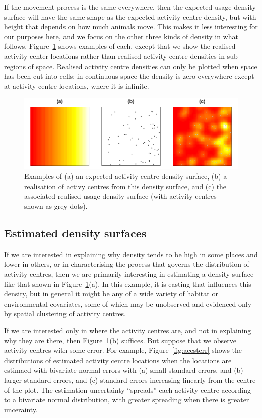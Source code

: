 \documentclass[10pt,a4paper]{article}
\begin{document}
If the movement process is the same everywhere, then the expected usage density surface will have the same shape as the expected activity centre density, but with height that depends on how much animals move.  This makes it less interesting for our purposes here, and we focus on the other three kinds of density in what follows. Figure~\ref{fig:densities} shows examples of each, except that we show the realised activity center locations rather than realised activity centre densities in sub-regions of space. Realised activity centre densities can only be plotted when space has been cut into cells; in continuous space the density is zero everywhere except at activity centre locations, where it is infinite.

\begin{figure}[htbp]
\centering
\includegraphics[width=\textwidth]{densities.pdf}
\caption{Examples of (a) an expected activity centre density surface, (b) a realisation of activy centres from this density surface, and (c) the associated realised usage density surface (with activity centres shown as grey dots).}
\label{fig:densities}
\end{figure}

\subsection{Estimated density surfaces}

If we are interested in explaining why density tends to be high in some places and lower in others, or in characterising the process that governs the distribution of activity centres, then we are primarily interesting in estimating a density surface like that shown in Figure~\ref{fig:densities}(a). In this example, it is easting that influences this density, but in general it might be any of a wide variety of habitat or environmental covariates, some of which may be unobserved and evidenced only by spatial clustering of activity centres. 

If we are interested only in where the activity centres are, and not in explaining why they are there, then Figure~\ref{fig:densities}(b) suffices. But suppose that we observe activity centres with some error. For example, Figure~\ref{fig:acesterr} shows the distributions of estimated activity centre locations when the locations are estimaed with bivariate normal errors with (a) small standard errors, and (b) larger standard errors, and (c) standard errors increasing linearly from the centre of the plot. The estimation uncertainty ``spreads'' each activity centre according to a bivariate normal distribution, with greater spreading when there is greater uncerainty.
\end{document}
